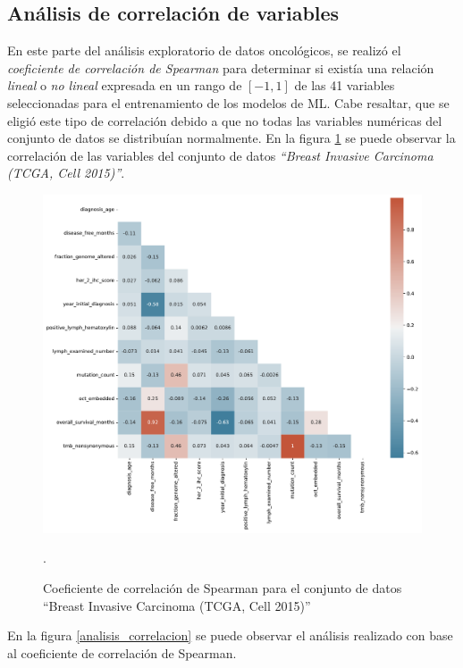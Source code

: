 \clearpage	
\newpage
\subsection{Análisis de correlación de variables }
En este parte del análisis exploratorio de datos oncológicos, se realizó el \textit{coeficiente de correlación de Spearman} para determinar si existía una relación \textit{lineal} o \textit{no lineal} expresada en un rango de $[-1,1]$ de las 41 variables seleccionadas para el entrenamiento de los modelos de ML. Cabe resaltar, que se eligió este tipo de correlación debido a que no todas las variables numéricas del conjunto de datos se distribuían normalmente. En la figura \ref{heatmap} se puede observar la correlación de las variables del conjunto de datos \textit{“Breast Invasive Carcinoma (TCGA, Cell 2015)”}.

\begin{figure}[htb!]
	\centering
	\includegraphics[width=1
	\linewidth]{NOTEBOOK/IMAGENES_CORRELACION/correlacion_spearman}
	\caption{Coeficiente de correlación de Spearman para el conjunto de datos “Breast Invasive Carcinoma (TCGA, Cell 2015)”}.
	\label{heatmap}
\end{figure}

En la figura \ref{analisis_correlacion} se puede observar el análisis realizado con base al coeficiente de correlación de Spearman. 

